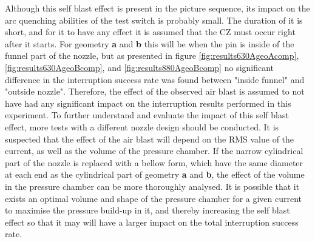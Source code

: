 \documentclass[10pt,b5paper,twoside]{article}
\begin{document}
Although this self blast effect is present in the picture sequence, its impact on the arc quenching abilities of the test switch is probably small. The duration of it is short, and for it to have any effect it is assumed that the CZ must occur right after it starts. For geometry \textbf{a} and \textbf{b} this will be when the pin is inside of the funnel part of the nozzle, but as presented in figure \ref{fig:results630AgeoAcomp}, \ref{fig:results630AgeoBcomp}, and \ref{fig:results880AgeoBcomp} no significant difference in the interruption success rate was found between "inside funnel" and "outside nozzle". Therefore, the effect of the observed air blast is assumed to not have had any significant impact on the interruption results performed in this experiment. To further understand and evaluate the impact of this self blast effect, more tests with a different nozzle design should be conducted. It is suspected that the effect of the air blast will depend on the RMS value of the current, as well as the volume of the pressure chamber. If the narrow cylindrical part of the nozzle is replaced with a bellow form, which have the same diameter at each end as the cylindrical part of geometry \textbf{a} and \textbf{b}, the effect of the volume in the pressure chamber can be more thoroughly analysed. It is possible that it exists an optimal volume and shape of the pressure chamber for a given current to maximise the pressure build-up in it, and thereby increasing the self blast effect so that it may will have a larger impact on the total interruption success rate.
\end{document}
